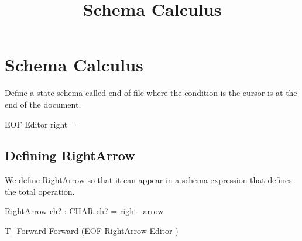 \documentclass{article}
\title{Schema Calculus}
\begin{document}
\maketitle

\section{Schema Calculus}
Define a state schema called end of file where the condition is the cursor is at the end of the document.

\begin{schema}{EOF}
    Editor
    \where
    right = \langle \rangle
\end{schema}

\subsection{Defining RightArrow}
We define RightArrow so that it can appear in a schema expression that defines the total operation.

\begin{schema}{RightArrow}
    ch? : CHAR
    \where
    ch? = right\_arrow
\end{schema}

\begin{zed}
    T\_Forward \widehat{=} Forward \vee (EOF \wedge RightArrow \wedge Editor  )
\end{zed}
\end{document}
